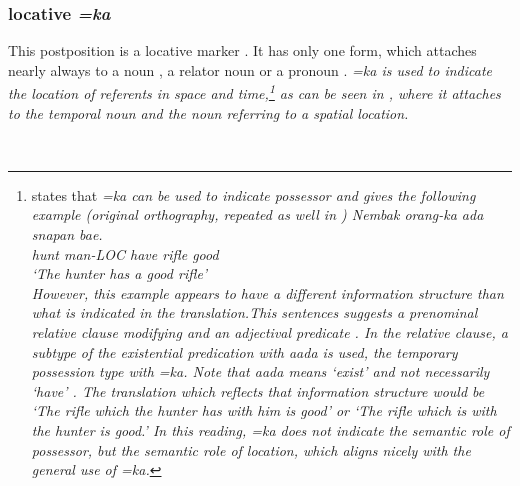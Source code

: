\subsubsection{locative \em =ka\em}\label{sec:morph:=ka}
This postposition is a locative marker 
\citep{SmithEtAl2004,
Ansaldo2008genesis,%
Ansaldo2009book}.
It has only one form, which attaches nearly always to a noun , a relator noun  or a pronoun . 
\em =ka \em  is used to indicate the location of referents in space and time,\footnote{\citet[23]{Ansaldo2005ms}
 states that \em =ka \em can be used to indicate possessor and gives the following example (original orthography, repeated as well in \citet[30]{Ansaldo2008genesis})
 \gll Nembak orang-ka ada snapan bae. \\
 hunt man-\textsc{LOC} have rifle good\\
 `The hunter has a good rifle'\\
 However, this example appears to have a different information structure than what is indicated in the translation.This sentences suggests a prenominal relative clause modifying  and an adjectival predicate . In the relative clause, a subtype of the existential predication with \em aada \em  {} is used, the temporary possession type with \em =ka\em. Note that \em aada \em means `exist' and not necessarily `have' . The translation which reflects that information structure would be `The rifle which the hunter has with him is good' or `The rifle which is with the hunter is good.' In this reading, \em =ka \em does not indicate the semantic role of possessor, but the semantic role of location, which aligns nicely with the general use of \em =ka\em.
}
as can be seen in , where it attaches to the temporal noun  and the noun  referring to a spatial location.


 \\ 

